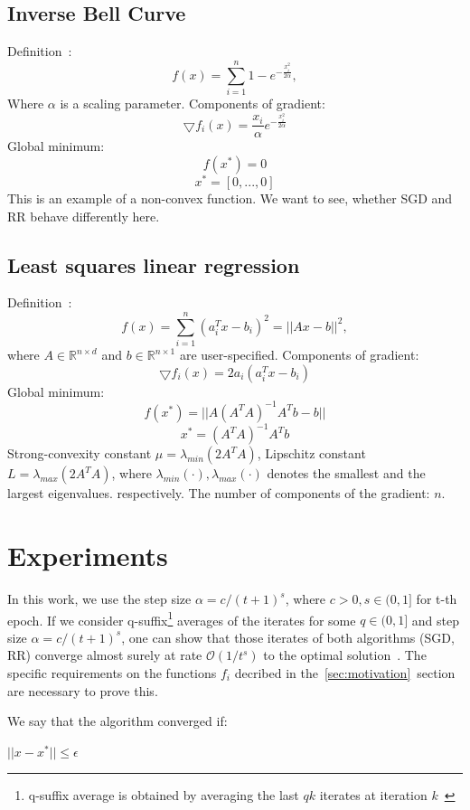 \documentclass[10pt,conference,compsocconf]{IEEEtran}
\begin{document}
\subsection{Inverse Bell Curve}
\noindent Definition~:
$$f(x) = \sum_{i=1}^n 1 - e^{-\frac{x_i^2}{2 \alpha}},$$
Where $\alpha$ is a scaling parameter. 
Components of gradient:
$$\bigtriangledown f_i(x) = \frac{x_i}{\alpha} e^{-\frac{x_i^2}{2 \alpha}}$$
Global minimum:
$$f(x^*) = 0$$
$$x^* = [0,...,0]$$
This is an example of a non-convex function. We want to see, whether SGD and RR behave differently here.

\subsection{Least squares linear regression}

\noindent Definition~\cite{REGRESSION}:
$$f(x) = \sum_{i=1}^n (a_i^T x-b_i)^2 = ||Ax-b||^2,$$
\noindent where $A \in \mathbb{R}^{n \times d}$ and $b \in \mathbb{R}^{n
\times 1}$ are user-specified.
Components of gradient:
$$\bigtriangledown f_i(x) = 2 a_i(a_i^T x - b_i)$$
Global minimum:
$$f(x^*) = ||A (A^T A)^{-1} A^T b - b||$$
$$x^* = (A^T A)^{-1} A^T b$$
Strong-convexity constant $\mu = \lambda_{min}(2A^TA)$, Lipschitz constant
\mbox{$L=\lambda_{max}(2A^TA)$}, where $\lambda_{min}(\cdot),
\lambda_{max}(\cdot)$ denotes the smallest and the largest
eigenvalues. respectively. The number of components of the gradient: $n$.


\section{Experiments}


\medskip

In this work, we use the step size $\alpha = c / (t+1)^s$, where $c>0, s \in
(0, 1]$ for t-th epoch. If we consider q-suffix\footnote{q-suffix
average is obtained by averaging the last $qk$ iterates at iteration
$k$~\cite{COMPONENTFUNCTION}} averages of the iterates for some $q \in (0,1]$
and step size $\alpha = c / (t+1)^s$, one can show that those iterates
of both algorithms (SGD, RR) converge almost surely  at rate
$\mathcal{O}(1 / t^s)$ to the optimal solution~\cite{COMPONENTFUNCTION}.
The specific requirements on the functions $f_i$ decribed in
the~\ref{sec:motivation}~section are necessary to prove this.

We say that the algorithm converged if:

\centerline{$||x - x^{*}|| \leq \epsilon$}
\end{document}
